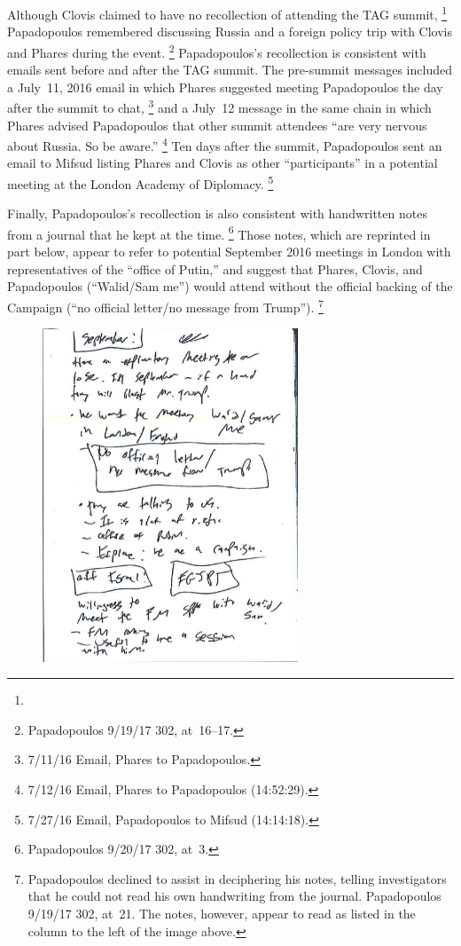 Although Clovis claimed to have no recollection of attending the TAG summit,%
\footnote{}
Papadopoulos remembered discussing Russia and a foreign policy trip with Clovis and Phares during the event.%
\footnote{Papadopoulos 9/19/17 302, at~16--17.}
Papadopoulos's recollection is consistent with emails sent before and after the TAG summit.
The pre-summit messages included a July~11, 2016 email in which Phares suggested meeting Papadopoulos the day after the summit to chat,%
\footnote{7/11/16 Email, Phares to Papadopoulos.}
and a July~12 message in the same chain in which Phares advised Papadopoulos that other summit attendees ``are very nervous about Russia. So be aware.''%
\footnote{7/12/16 Email, Phares to Papadopoulos (14:52:29).}
Ten days after the summit, Papadopoulos sent an email to Mifsud listing Phares and Clovis as other ``participants'' in a potential meeting at the London Academy of Diplomacy.%
\footnote{7/27/16 Email, Papadopoulos to Mifsud (14:14:18).}

Finally, Papadopoulos's recollection is also consistent with handwritten notes from a journal that he kept at the time.%
\footnote{Papadopoulos 9/20/17 302, at~3.}
Those notes, which are reprinted in part below, appear to refer to potential September 2016 meetings in London with representatives of the ``office of Putin,'' and suggest that Phares, Clovis, and Papadopoulos (``Walid/Sam me'') would attend without the official backing of the Campaign (``no official letter/no message from Trump'').%
\footnote{Papadopoulos declined to assist in deciphering his notes, telling investigators that he could not read his own handwriting from the journal.
Papadopoulos 9/19/17 302, at~21.
The notes, however, appear to read as listed in the column to the left of the image above.}

\begin{figure}
    \vspace{-20pt}
    \begin{center}
        \includegraphics[width=3in]{images/p-92-papadopolous-notes.png}%
    \end{center}
    \vspace{-20pt}
    \caption*{}
    \vspace{-10pt}
    \label{fig:papadopolous-notes}
\end{figure}


